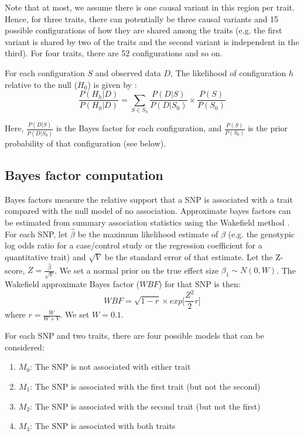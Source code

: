 \documentclass{article}
\begin{document}
\noindent Note that at most, we assume there is one causal variant in this region per trait. Hence, for three traits, there can potentially be three causal variants and 15 possible configurations of how they are shared among the traits (e.g. the first variant is shared by two of the traits and the second variant is independent in the third). For four traits, there are 52 configurations and so on.

For each configuration $S$ and observed data $D$, The likelihood of configuration $h$ relative to the null ($H_0$) is given by \citep{Giambartolomei:2014aa}:
\begin{equation}
\label{rbf_equation}
\frac{P(H_h|D)}{P(H_0|D)} = \sum_{S \in S_h} \frac{P(D|S)}{P(D|S_0)} \times \frac{P(S)}{P(S_0)}
\end{equation}

\noindent Here, $\frac{P(D|S)}{P(D|S_0)}$ is the Bayes factor for each configuration, and $\frac{P(S)}{P(S_0)}$ is the prior probability of that configuration (see below).

\subsection{Bayes factor computation}
\label{bf_comp}
Bayes factors measure the relative support that a SNP is associated with a trait compared with the null model of no association. Approximate bayes factors can be estimated from summary association statistics using the Wakefield method \citep{Wakefield:2009aa}. For each SNP, let $\hat{\beta}$ be the maximum likelihood estimate of $\beta$ (e.g. the genotypic log odds ratio for a case/control study or the regression coefficient for a quantitative trait) and $\sqrt{V}$ be the standard error of that estimate. Let the Z-score, $Z = \frac{\hat{\beta}}{\sqrt{V}}$. We set a normal prior on the true effect size $\beta_1 \sim N(0,W)$. The Wakefield approximate Bayes factor ($WBF$) for that SNP is then:
\begin{equation}
WBF = \sqrt{1-r} \times exp \Big[\frac{Z^2}{2} r \Big]
\end{equation}
where $r = \frac{W}{W+V}$. We set $W = 0.1$.

For each SNP and two traits, there are four possible models that can be considered:
\begin{enumerate}[start=0]
  \item $M_0$: The SNP is not associated with either trait
  \item $M_1$: The SNP is associated with the first trait (but not the second)
  \item $M_2$: The SNP is associated with the second trait (but not the first)
  \item $M_3$: The SNP is associated with both traits
\end{enumerate}
\end{document}
